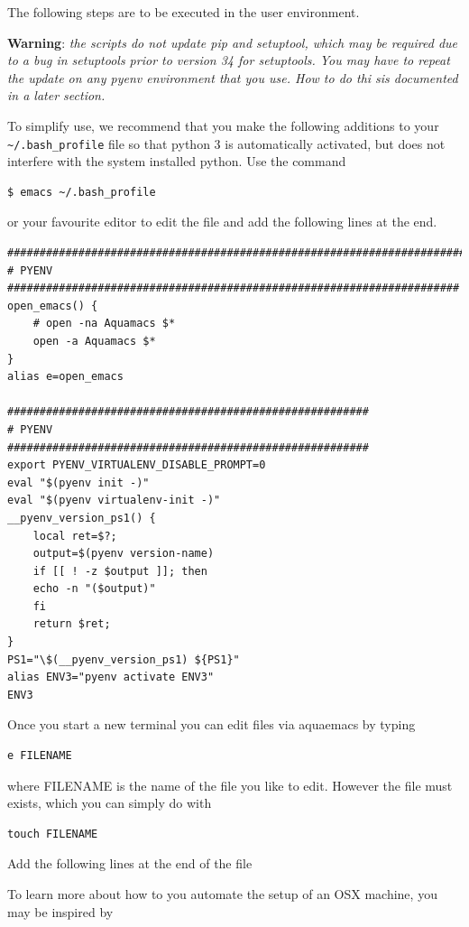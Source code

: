 The following steps are to be executed in the user environment.

\textbf{Warning}: \emph{the scripts do not update pip and setuptool,
which may be required due to a bug in setuptools prior to version 34 for
setuptools. You may have to repeat the update on any pyenv environment
that you use. How to do thi sis documented in a later section.}

To simplify use, we recommend that you make the following additions to
your \texttt{\textasciitilde{}/.bash\_profile} file so that python 3 is
automatically activated, but does not interfere with the system
installed python. Use the command

\begin{verbatim}
$ emacs ~/.bash_profile
\end{verbatim}

or your favourite editor to edit the file and add the following lines at
the end.

\begin{verbatim}
####################################################################### 
# PYENV
######################################################################
open_emacs() {
    # open -na Aquamacs $*
    open -a Aquamacs $*    
}
alias e=open_emacs

########################################################
# PYENV
########################################################
export PYENV_VIRTUALENV_DISABLE_PROMPT=0
eval "$(pyenv init -)"
eval "$(pyenv virtualenv-init -)"
__pyenv_version_ps1() {
    local ret=$?;
    output=$(pyenv version-name)
    if [[ ! -z $output ]]; then
    echo -n "($output)"
    fi
    return $ret;
}
PS1="\$(__pyenv_version_ps1) ${PS1}"   
alias ENV3="pyenv activate ENV3"
ENV3
\end{verbatim}

Once you start a new terminal you can edit files via aquaemacs by typing

\begin{verbatim}
e FILENAME
\end{verbatim}

where FILENAME is the name of the file you like to edit. However the
file must exists, which you can simply do with

\begin{verbatim}
touch FILENAME
\end{verbatim}

Add the following lines at the end of the file

To learn more about how to you automate the setup of an OSX machine, you
may be inspired by


